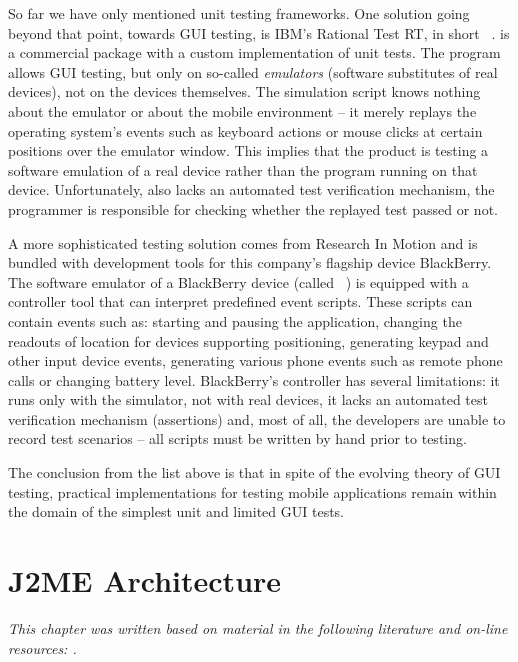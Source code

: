 So far we have only mentioned unit testing frameworks. One solution going beyond that point,
towards GUI testing, is IBM's Rational Test RT, in short ~.  is a commercial package
with a custom implementation of unit tests. The program allows GUI testing, but only on so-called
\emph{emulators} (software substitutes of real devices), not on the devices themselves. The simulation
script knows nothing about the emulator or about the mobile environment -- it merely replays
the operating system's events such as keyboard actions or mouse clicks at certain positions over the
emulator window. This implies that the product is testing a software emulation of a real
device rather than the program running on that device. Unfortunately,  also lacks an automated test
verification mechanism, the programmer is responsible for checking whether the replayed test passed or not.

A more sophisticated testing solution comes from Research In Motion and is bundled with development
tools for this company's flagship device BlackBerry. The software emulator of a BlackBerry device
(called ~) is equipped with a controller tool that can interpret
predefined event scripts. These scripts can contain events such as: starting and pausing the
application, changing the readouts of  location  for devices supporting  positioning,
generating keypad and other input device events, generating various phone events such as remote
phone calls or changing battery level. BlackBerry's controller has several limitations: it runs only
with the simulator, not with real devices, it lacks an automated test verification mechanism
(assertions) and, most of all, the developers are unable to record test scenarios -- all scripts
must be written by hand prior to testing.

The conclusion from the list above is that in spite of the evolving theory of GUI testing,
practical implementations for testing mobile applications remain within the domain of the simplest
unit and limited GUI tests.

\section{J2ME Architecture}

{\itshape\small This chapter was written based on material in the following
literature and on-line resources: \cite{midpspec,j2mecrackingcode,enterprisej2me,j2mereference,midpstyle}.}

